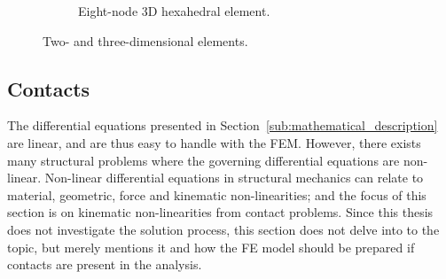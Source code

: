 \begin{figure}[t]
\begin{subfigure}{.5\textwidth}
\begin{center}
		\caption{Eight-node 3D hexahedral element.}
		\label{subfig:hexahedral_element}
	\end{center}
	\end{subfigure}%
	\caption{Two- and three-dimensional elements.}
	\label{fig:elements}
\end{figure}



\subsection{Contacts} %
\label{sub:contacts}
The differential equations presented in Section~\ref{sub:mathematical_description} are linear, and are thus easy to handle with the FEM. However, there exists many structural problems where the governing differential equations are non-linear. Non-linear differential equations in structural mechanics can relate to material, geometric, force and kinematic non-linearities; and the focus of this section is on kinematic non-linearities from contact problems. Since this thesis does not investigate the solution process, this section does not delve into to the topic, but merely mentions it and how the FE model should be prepared if contacts are present in the analysis.


